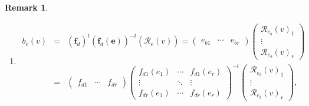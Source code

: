 \documentclass[aps,preprint]{revtex4}
\newtheorem{remark}[theorem]{Remark}
\begin{document}
\begin{remark}
\begin{enumerate}
\begin{enumerate}
\item 
\begin{eqnarray}
b_{e}\left( v\right) &=&\left( \overset{}{\boldsymbol{f}_{d}}\right)
^{t}\left( \overset{}{\boldsymbol{f}_{d}\left( \boldsymbol{e}\right) }%
\right) ^{-t}\left( \overset{}{\mathcal{R}_{e}\left( v\right) }\right)
=\left( 
\begin{array}{ccc}
e_{b1} & \cdots & e_{br}%
\end{array}%
\right) \left( 
\begin{array}{c}
\mathcal{R}_{e_{b}}\left( v\right) _{1} \\ 
\vdots \\ 
\mathcal{R}_{e_{b}}\left( v\right) _{r}%
\end{array}%
\right) \\
&=&\left( 
\begin{array}{ccc}
f_{d1} & \cdots & f_{dr}%
\end{array}%
\right) \left( 
\begin{array}{ccc}
f_{d1}\left( e_{1}\right) & \cdots & f_{d1}\left( e_{r}\right) \\ 
\vdots & \ddots & \vdots \\ 
f_{dr}\left( e_{1}\right) & \cdots & f_{dr}\left( e_{r}\right)%
\end{array}%
\right) ^{-t}\left( 
\begin{array}{c}
\mathcal{R}_{e_{b}}\left( v\right) _{1} \\ 
\vdots \\ 
\mathcal{R}_{e_{b}}\left( v\right) _{r}%
\end{array}%
\right) ,
\end{eqnarray}


\end{enumerate}
\end{enumerate}
\end{remark}
\end{document}
